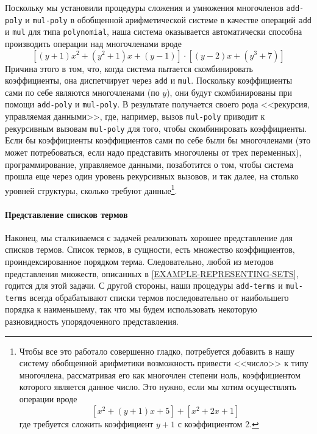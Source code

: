 Поскольку мы установили процедуры сложения и умножения
многочленов
{\tt add-poly} и {\tt mul-poly} в обобщенной
арифметической системе в качестве операций {\tt add} и
{\tt mul} для типа {\tt polynomial}, наша система
оказывается автоматически способна производить операции над
многочленами вроде
$$
[(y+1)x^2 + (y^2+1)x + (y-1)] \cdot [(y-2)x + (y^3+7)]
$$
Причина этого в том, что, когда система пытается скомбинировать
коэффициенты, она диспетчирует через {\tt add} и
{\tt mul}.  Поскольку коэффициенты сами по себе являются
многочленами (по $y$), они будут скомбинированы
при помощи {\tt add-poly} и {\tt mul-poly}.  В
результате получается своего рода 
 <<рекурсия, управляемая данными>>, где,
например, вызов {\tt mul-poly} приводит к рекурсивным вызовам
{\tt mul-poly} для того, чтобы скомбинировать коэффициенты.
Если бы коэффициенты коэффициентов сами по себе были бы многочленами
(это может потребоваться, если надо представить многочлены от трех
переменных), программирование, управляемое данными, позаботится о том,
чтобы система прошла еще через один уровень рекурсивных вызовов, и так
далее, на столько уровней структуры, сколько требуют данные\footnote{Чтобы все это работало совершенно гладко,
потребуется добавить в нашу систему обобщенной арифметики возможность
привести <<число>> к типу многочлена, рассматривая его как многочлен
степени ноль, коэффициентом которого является данное число.  Это нужно, если
мы хотим осуществлять операции вроде
$$
[x^2 + (y+1)x+ 5] + [x^2 + 2x + 1]
$$
где требуется сложить коэффициент 
$y+1$ с коэффициентом 2.}.

\paragraph{Представление списков термов}


Наконец, мы сталкиваемся с задачей реализовать хорошее
представление
для списков термов.  Список термов, в сущности, есть 
множество коэффициентов, проиндексированное порядком терма.
Следовательно, любой из методов представления множеств, описанных в
\ref{EXAMPLE-REPRESENTING-SETS}, годится для этой задачи.
С другой стороны, наши процедуры {\tt add-terms} и
{\tt mul-terms} всегда обрабатывают списки термов
последовательно от наибольшего порядка к наименьшему, так что мы
будем использовать некоторую разновидность упорядоченного представления.

